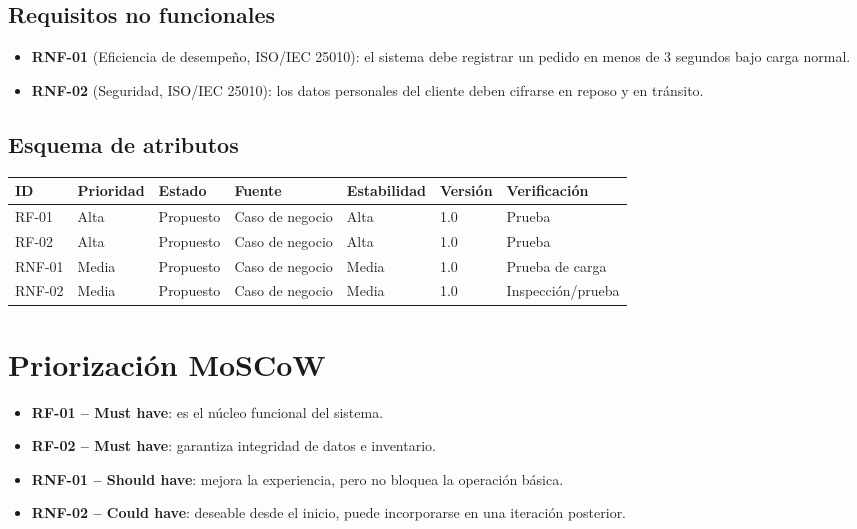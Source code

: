 \documentclass[11pt,a4paper]{article}
\begin{document}
\subsection*{Requisitos no funcionales}
\begin{itemize}
    \item \textbf{RNF-01} (Eficiencia de desempeño, ISO/IEC 25010): el sistema debe registrar un pedido en menos de 3 segundos bajo carga normal.
    \item \textbf{RNF-02} (Seguridad, ISO/IEC 25010): los datos personales del cliente deben cifrarse en reposo y en tránsito.
\end{itemize}

\subsection*{Esquema de atributos}
\begin{center}
\begin{tabular}{lllllll}
\toprule
\textbf{ID} & \textbf{Prioridad} & \textbf{Estado} & \textbf{Fuente} & \textbf{Estabilidad} & \textbf{Versión} & \textbf{Verificación} \\
\midrule
RF-01  & Alta  & Propuesto & Caso de negocio & Alta  & 1.0 & Prueba \\
RF-02  & Alta  & Propuesto & Caso de negocio & Alta  & 1.0 & Prueba \\
RNF-01 & Media & Propuesto & Caso de negocio & Media & 1.0 & Prueba de carga \\
RNF-02 & Media & Propuesto & Caso de negocio & Media & 1.0 & Inspección/prueba \\
\bottomrule
\end{tabular}
\end{center}

\newpage

\section{Priorización MoSCoW}

\begin{itemize}
    \item \textbf{RF-01 -- Must have}: es el núcleo funcional del sistema.
    \item \textbf{RF-02 -- Must have}: garantiza integridad de datos e inventario.
    \item \textbf{RNF-01 -- Should have}: mejora la experiencia, pero no bloquea la operación básica.
    \item \textbf{RNF-02 -- Could have}: deseable desde el inicio, puede incorporarse en una iteración posterior.
\end{itemize}
\end{document}
